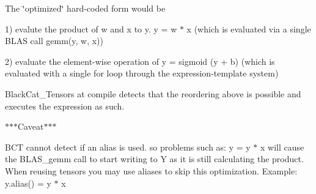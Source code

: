The \char`\"{}optimized\char`\"{} hard-\/coded form would be

1) evalute the product of {\ttfamily w} and {\ttfamily x} to {\ttfamily y}. {\ttfamily y = w $\ast$ x} (which is evaluated via a single B\+L\+AS call gemm(y, w, x))

2) evaluate the element-\/wise operation of {\ttfamily y = sigmoid (y + b)} (which is evaluated with a single for loop through the expression-\/template system)

Black\+Cat\+\_\+\+Tensors at compile detects that the reordering above is possible and executes the expression as such.

$\ast$$\ast$$\ast$\+Caveat$\ast$$\ast$$\ast$

B\+CT cannot detect if an alias is used. so problems such as\+: y = y $\ast$ x will cause the B\+L\+A\+S\+\_\+gemm call to start writing to Y as it is still calculating the product. When reusing tensors you may use aliases to skip this optimization. Example\+: y.\+alias() = y $\ast$ x 